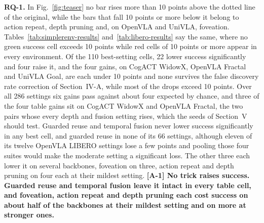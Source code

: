 \textbf{RQ-1.} In Fig.~\ref{fig:teaser} no bar rises more than 10 points
above the dotted line of the original, while the bars that fall 10 points or more
below it belong to action repeat, depth pruning and, on OpenVLA and
UniVLA, foveation. Tables~\ref{tab:simplerenv-results} and~\ref{tab:libero-results} say
the same, where no green success cell exceeds 10 points while red cells
of 10 points or more appear in every environment. Of the 110 best-setting cells, 22
lower success significantly and four raise it, and the four gains, on
CogACT WidowX, OpenVLA Fractal and UniVLA Goal, are each under 10 points and
none survives the false discovery rate correction of Section~IV-A, while
most of the drops exceed 10 points. Over all 286 settings six gains pass
against about four expected by chance, and three of the four table gains
sit on CogACT WidowX and OpenVLA Fractal, the two pairs whose every depth
and fusion setting rises, which the seeds of Section~V should test.
Guarded reuse and temporal
fusion never lower success significantly in any best cell, and guarded
reuse in none of its 66 settings, although
eleven of its twelve OpenVLA LIBERO settings lose a few points and
pooling those four suites would make the moderate setting a significant
loss. The other
three each lower it on several backbones, foveation on three, action
repeat and depth pruning on four each at their mildest setting.
\textbf{[A-1] No trick raises success. Guarded reuse and temporal fusion
leave it intact in every table cell, and foveation, action repeat and
depth pruning each cost success on about half of the backbones at their
mildest setting and on more at stronger ones.}

